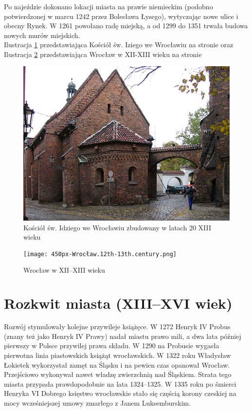 \documentclass{article}
\begin{document}
Po najeździe dokonano lokacji miasta na prawie niemieckim (podobno potwierdzonej w marcu 1242 przez Bolesława Łysego), wytyczając nowe ulice i obecny Rynek. W 1261 powołano radę miejską, a od 1299 do 1351 trwała budowa nowych murów miejskich.\\
Ilustracja \ref{fig:kosciol} przedstawiająca Kościół św. Iziego we Wrocławiu
na stronie \pageref{fig:kosciol} oraz Ilustracja \ref{fig:wroclaw w XII} przedstawiająca Wrocław w XII-XIII wieku na stronie \pageref{fig:wroclaw w XII}
\begin{figure}[h!]
\centering
\includegraphics[scale=0.5]{450px-Wroclaw_kosciol_sw.Idziego_od_plKatedralnego.jpg}
\caption{Kościół św. Idziego we Wrocławiu zbudowany w latach 20 XIII wieku}
\label{fig:kosciol}
\end{figure}

\begin{figure}[h!]
\centering
\texttt{[image: 450px-Wrocław.12th-13th.century.png]}
\caption{Wrocław w XII–XIII wieku}
\label{fig:wroclaw w XII}
\end{figure}
\newpage
\section{Rozkwit miasta (XIII–XVI wiek)}
Rozwój stymulowały kolejne przywileje książęce. W 1272 Henryk IV Probus (znany też jako Henryk IV Prawy) nadał miastu prawo mili, a dwa lata później pierwszy w Polsce przywilej prawa składu. W 1290 na Probusie wygasła pierwotna linia piastowskich książąt wrocławskich. W 1322 roku Władysław Łokietek wykorzystał zamęt na Śląsku i na pewien czas opanował Wrocław. Przejściowo wykonywał nawet władzę zwierzchnią nad Śląskiem. Strata tego miasta przypada prawdopodobnie na lata 1324–1325. W 1335 roku po śmierci Henryka VI Dobrego księstwo wrocławskie stało się częścią korony czeskiej na mocy wcześniejszej umowy zmarłego z Janem Luksemburskim.\\
\end{document}
